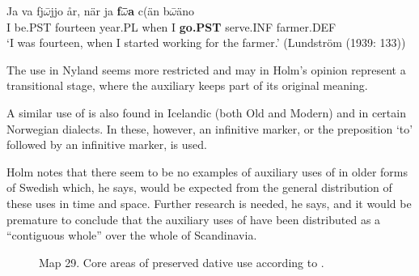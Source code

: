 
\ea\label{}
\gll Ja  va  fj$\omega $\={ }jjo   år,  när  ja  \textbf{f}\textbf{$\omega $}\textbf{\={ }a} c(än  b$\omega $\={ }äno   \\
I  be.PST  fourteen  year.PL  when  I  \textbf{go.PST} serve.INF  farmer.DEF  \\
\glt ‘I was fourteen, when I started working for the farmer.’ (Lundström (1939: 133))
\z

The use in Nyland seems more restricted and may in Holm’s opinion represent a transitional stage, where the auxiliary keeps part of its original meaning. 


A similar use of  is also found in Icelandic (both Old and Modern) and in certain Norwegian dialects. In these, however, an infinitive marker, or the preposition  ‘to’ followed by an infinitive marker, is used. 


Holm notes that there seem to be no examples of auxiliary uses of  in older forms of Swedish which, he says, would be expected from the general distribution of these uses in time and space. Further research is needed, he says, and it would be premature to conclude that the auxiliary uses of  have been distributed as a “contiguous whole” over the whole of Scandinavia.




\begin{figure}[h]

\begin{minipage}{6.53125in}

\label{bkm:Ref134863405}Map 29. Core areas of preserved dative use according to \citet{Reinhammar1973}.


\end{minipage}

\end{figure}

